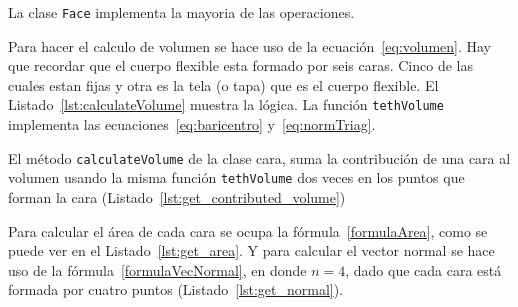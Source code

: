 
La clase \texttt{Face} implementa la mayoria de las operaciones.

Para hacer el calculo de volumen se hace uso de la ecuación~\eqref{eq:volumen}.
Hay que recordar que el cuerpo flexible esta formado por seis caras.
Cinco de las cuales estan fijas y otra es la tela (o tapa) que es el cuerpo flexible.
El Listado~\ref{lst:calculateVolume} muestra la lógica. La función \texttt{tethVolume} implementa las ecuaciones~\eqref{eq:baricentro} y~\eqref{eq:normTriag}.


El método \texttt{calculateVolume} de la clase cara, suma la contribución de una cara al volumen usando la misma función \texttt{tethVolume} dos veces en los puntos que forman la cara (Listado~\ref{lst:get_contributed_volume})


Para calcular el área de cada cara se ocupa la fórmula~\eqref{formulaArea}, como se puede ver en el Listado~\ref{lst:get_area}.
Y para calcular el vector normal se hace uso de la fórmula~\eqref{formulaVecNormal}, en donde $n=4$, dado que cada cara está formada por cuatro puntos (Listado~\ref{lst:get_normal}).

